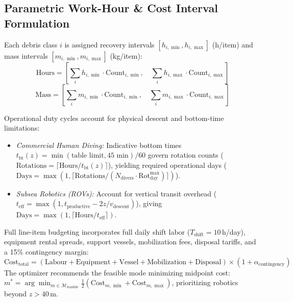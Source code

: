 \documentclass[conference]{IEEEtran}
\begin{document}
\subsection{Parametric Work-Hour \& Cost Interval Formulation}
Each debris class $i$ is assigned recovery intervals $[h_{i,\min}, h_{i,\max}]$ (h/item) and mass intervals $[m_{i,\min}, m_{i,\max}]$ (kg/item):
\begin{equation}
\text{Hours} = \left[ \sum_{i} h_{i,\min} \cdot \text{Count}_{i,\min}, \quad \sum_{i} h_{i,\max} \cdot \text{Count}_{i,\max} \right]
\label{eq:hours}
\end{equation}
\begin{equation}
\text{Mass} = \left[ \sum_{i} m_{i,\min} \cdot \text{Count}_{i,\min}, \quad \sum_{i} m_{i,\max} \cdot \text{Count}_{i,\max} \right]
\label{eq:mass}
\end{equation}

Operational duty cycles account for physical descent and bottom-time limitations:
\begin{itemize}
    \item \emph{Commercial Human Diving:} Indicative bottom times $t_{\text{bt}}(z) = \min(\text{table limit}, 45\text{ min})/60$ govern rotation counts ($\text{Rotations} = \lceil \text{Hours} / t_{\text{bt}}(z) \rceil$), yielding required operational days ($\text{Days} = \max(1, \lceil \text{Rotations} / (N_{\text{divers}} \cdot \text{Rot}_{\text{day}}^{\max}) \rceil)$).
    \item \emph{Subsea Robotics (ROVs):} Account for vertical transit overhead ($t_{\text{eff}} = \max(1, t_{\text{productive}} - 2z / v_{\text{descent}})$), giving $\text{Days} = \max(1, \lceil \text{Hours} / t_{\text{eff}} \rceil)$.
\end{itemize}

Full line-item budgeting incorporates full daily shift labor ($T_{\text{shift}} = 10$\,h/day), equipment rental spreads, support vessels, mobilization fees, disposal tariffs, and a 15\% contingency margin:
\begin{equation}
\text{Cost}_{\text{total}} = (\text{Labour} + \text{Equipment} + \text{Vessel} + \text{Mobilization} + \text{Disposal}) \times (1 + \alpha_{\text{contingency}})
\label{eq:cost}
\end{equation}
The optimizer recommends the feasible mode minimizing midpoint cost: $m^* = \arg\min_{m \in \mathcal{M}_{\text{feasible}}} \frac{1}{2}(\text{Cost}_{m,\min} + \text{Cost}_{m,\max})$, prioritizing robotics beyond $z > 40$\,m.
\end{document}
